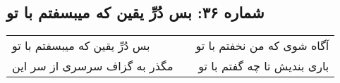 \begin{center}
\section*{شماره ۳۶: بس دُرِّ یقین که میبسفتم با تو}
\label{sec:036}
\begin{longtable}{l p{0.5cm} r}
بس دُرِّ یقین که میبسفتم با تو
&&
آگاه شوی که من نخفتم با تو
\\
مگذر به گزاف سرسری از سر این
&&
باری بندیش تا چه گفتم با تو
\\
\end{longtable}
\end{center}

